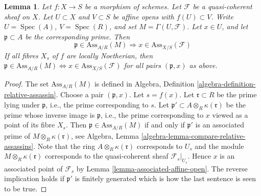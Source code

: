 \documentclass[10pt,a4paper]{amsart}
\theoremstyle{plain}
\newtheorem{lemma}[subsection]{Lemma}
\theoremstyle{definition}
\theoremstyle{remark}
\numberwithin{equation}{subsection}
\def\Spec{\mathop{\mathrm{Spec}}}
\begin{document}
\begin{lemma}
\label{lemma-relative-assassin-affine-open}
Let $f : X \to S$ be a morphism of schemes.
Let $\mathcal{F}$ be a quasi-coherent sheaf on $X$.
Let $U \subset X$ and $V \subset S$ be affine opens
with $f(U) \subset V$. Write $U = \Spec(A)$, $V = \Spec(R)$, and set
$M = \Gamma(U, \mathcal{F})$.
Let $x \in U$, and let $\mathfrak p \subset A$ be the corresponding prime.
Then
$$
\mathfrak p \in \text{Ass}_{A/R}(M) \Rightarrow
x \in \text{Ass}_{X/S}(\mathcal{F})
$$
If all fibres $X_s$ of $f$ are locally Noetherian, then
$\mathfrak p \in \text{Ass}_{A/R}(M) \Leftrightarrow
x \in \text{Ass}_{X/S}(\mathcal{F})$
for all pairs $(\mathfrak p, x)$ as above.
\end{lemma}

\begin{proof}
The set $\text{Ass}_{A/R}(M)$ is defined in
Algebra, Definition \ref{algebra-definition-relative-assassin}.
Choose a pair $(\mathfrak p, x)$. Let $s = f(x)$.
Let $\mathfrak r \subset R$ be the prime lying under $\mathfrak p$,
i.e., the prime corresponding to $s$.
Let $\mathfrak p' \subset A \otimes_R \kappa(\mathfrak r)$
be the prime whose inverse image is $\mathfrak p$, i.e.,
the prime corresponding to $x$ viewed as a point of its fibre $X_s$.
Then $\mathfrak p \in \text{Ass}_{A/R}(M)$ if and only if
$\mathfrak p'$ is an associated prime of
$M \otimes_R \kappa(\mathfrak r)$, see
Algebra, Lemma \ref{algebra-lemma-compare-relative-assassins}.
Note that the ring $A \otimes_R \kappa(\mathfrak r)$ corresponds to $U_s$
and the module $M \otimes_R \kappa(\mathfrak r)$ corresponds to the
quasi-coherent sheaf $\mathcal{F}_s|_{U_s}$.
Hence $x$ is an associated point of $\mathcal{F}_s$
by Lemma \ref{lemma-associated-affine-open}.
The reverse implication holds if $\mathfrak p'$ is finitely generated
which is how the last sentence is seen to be true.
\end{proof}
\end{document}
